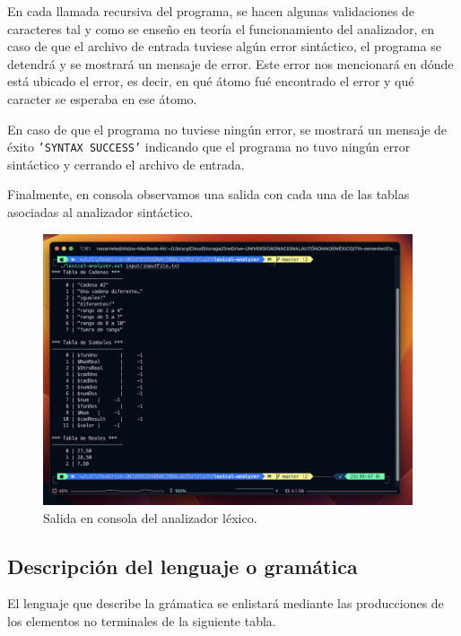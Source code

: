 \documentclass[12pt, a4paper]{article}
\begin{document}
En cada llamada recursiva del programa, se hacen algunas validaciones de caracteres tal y como se enseño en teoría el funcionamiento del analizador, en caso de que el archivo de entrada tuviese algún error sintáctico, el programa se detendrá y se mostrará un mensaje de error. Este error nos mencionará en dónde está ubicado el error, es decir, en qué átomo fué encontrado el error y qué caracter se esperaba en ese átomo.

En caso de que el programa no tuviese ningún error, se mostrará un mensaje de éxito \texttt{'SYNTAX SUCCESS'} indicando que el programa no tuvo ningún error sintáctico y cerrando el archivo de entrada.

Finalmente, en consola observamos una salida con cada una de las tablas asociadas al analizador sintáctico.


\begin{figure}[htpb!]
  \centering
    \includegraphics[height=8cm]{run32.png}
  \caption{Salida en consola del analizador léxico.}
  \end{figure}\par

\newpage

\subsection{Descripción del lenguaje o gramática}

El lenguaje que describe la grámatica se enlistará mediante las producciones de los elementos no terminales de la siguiente tabla.
\end{document}
